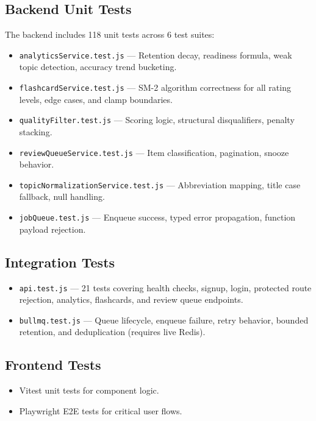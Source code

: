 \documentclass[12pt,a4paper]{article}
\begin{document}
\subsection{Backend Unit Tests}
The backend includes 118 unit tests across 6 test suites:
\begin{itemize}[leftmargin=1.5cm]
    \item \texttt{analyticsService.test.js} --- Retention decay, readiness formula, weak topic detection, accuracy trend bucketing.
    \item \texttt{flashcardService.test.js} --- SM-2 algorithm correctness for all rating levels, edge cases, and clamp boundaries.
    \item \texttt{qualityFilter.test.js} --- Scoring logic, structural disqualifiers, penalty stacking.
    \item \texttt{reviewQueueService.test.js} --- Item classification, pagination, snooze behavior.
    \item \texttt{topicNormalizationService.test.js} --- Abbreviation mapping, title case fallback, null handling.
    \item \texttt{jobQueue.test.js} --- Enqueue success, typed error propagation, function payload rejection.
\end{itemize}

\subsection{Integration Tests}
\begin{itemize}[leftmargin=1.5cm]
    \item \texttt{api.test.js} --- 21 tests covering health checks, signup, login, protected route rejection, analytics, flashcards, and review queue endpoints.
    \item \texttt{bullmq.test.js} --- Queue lifecycle, enqueue failure, retry behavior, bounded retention, and deduplication (requires live Redis).
\end{itemize}

\subsection{Frontend Tests}
\begin{itemize}[leftmargin=1.5cm]
    \item Vitest unit tests for component logic.
    \item Playwright E2E tests for critical user flows.
\end{itemize}
\end{document}
